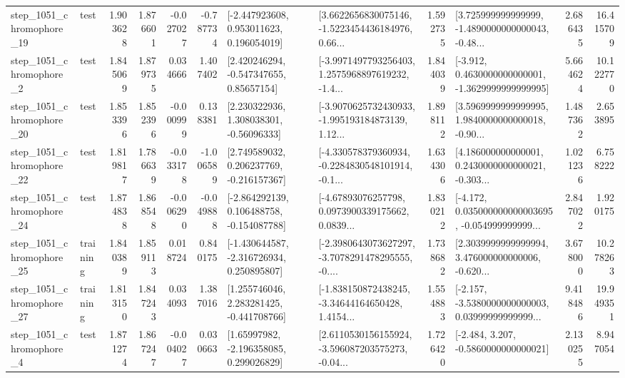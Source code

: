 \begin{tabular}{llrrrrllrlrr}
 step\_1051\_chromophore\_19 &      test &      1.903628 &    1.876601 &     -0.027027 & -0.787734 &    [-2.447923608, 0.953011623, 0.196054019] &  [3.6622656830075146, -1.5223454436184976, 0.66... &       1.592735 &  [3.725999999999999, -1.4890000000000043, -0.48... &            2.686435 &         16.415709 \\
  step\_1051\_chromophore\_2 &      test &      1.845069 &    1.879735 &      0.034666 &  1.407402 &     [2.420246294, -0.547347655, 0.85657154] &  [-3.9971497793256403, 1.2575968897619232, -1.4... &       1.844039 &  [-3.912, 0.4630000000000001, -1.3629999999999995] &            5.664624 &         10.122770 \\
 step\_1051\_chromophore\_20 &      test &      1.853396 &    1.852396 &     -0.000999 &  0.138381 &     [2.230322936, 1.308038301, -0.56096333] &  [-3.9070625732430933, -1.995193184873139, 1.12... &       1.898112 &  [3.5969999999999995, 1.9840000000000018, -0.90... &            1.487362 &          2.653895 \\
 step\_1051\_chromophore\_22 &      test &      1.819817 &    1.786639 &     -0.033178 & -1.006589 &    [2.749589032, 0.206237769, -0.216157367] &  [-4.330578379360934, -0.2284830548101914, -0.1... &       1.634306 &  [4.186000000000001, 0.2430000000000021, -0.303... &            1.021236 &          6.758222 \\
 step\_1051\_chromophore\_24 &      test &      1.874838 &    1.868548 &     -0.006290 & -0.049888 &   [-2.864292139, 0.106488758, -0.154087788] &  [-4.67893076257798, 0.0973900339175662, 0.0839... &       1.830212 &  [-4.172, 0.035000000000003695, -0.054999999999... &            2.847022 &          1.920175 \\
 step\_1051\_chromophore\_25 &  training &      1.840389 &    1.859113 &      0.018724 &  0.840175 &   [-1.430644587, -2.316726934, 0.250895807] &  [-2.3980643073627297, -3.7078291478295555, -0.... &       1.738682 &  [2.3039999999999994, 3.476000000000006, -0.620... &            3.678000 &         10.278263 \\
 step\_1051\_chromophore\_27 &  training &      1.813150 &    1.847243 &      0.034093 &  1.387016 &    [1.255746046, 2.283281425, -0.441708766] &  [-1.838150872438245, -3.34644164650428, 1.4154... &       1.554883 &  [-2.157, -3.5380000000000003, 0.03999999999999... &            9.418486 &         19.949351 \\
  step\_1051\_chromophore\_4 &      test &      1.871274 &    1.867247 &     -0.004027 &  0.030663 &     [1.65997982, -2.196358085, 0.299026829] &  [2.6110530156155924, -3.596087203575273, -0.04... &       1.726420 &               [-2.484, 3.207, -0.5860000000000021] &            2.130255 &          8.947054 \\

\end{tabular}
